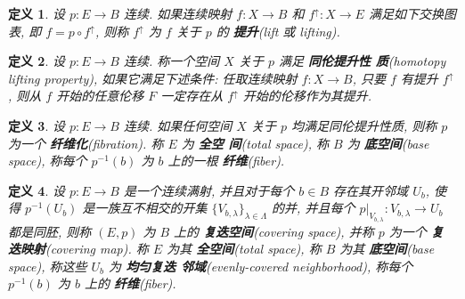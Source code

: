 \documentclass{ctexart}
\newtheorem*{defn}{定义}
\begin{document}
\begin{defn}
设 $p : E \to B$ 连续. 如果连续映射 $f : X \to B$ 和 $f^\uparrow : X
\to E$ 满足如下交换图表, 即 $f = p \circ f^\uparrow$, 则称
$f^\uparrow$ 为 $f$ 关于 $p$ 的 \textbf{提升}(lift 或 lifting).
\begin{center}
\end{center}
\end{defn}

\begin{defn}
设 $p : E \to B$ 连续. 称一个空间 $X$ 关于 $p$ 满足 \textbf{同伦提升性
  质}(homotopy lifting property), 如果它满足下述条件: 任取连续映射 $f
: X \to B$, 只要 $f$ 有提升 $f^\uparrow$, 则从 $f$ 开始的任意伦移 $F$
一定存在从 $f^\uparrow$ 开始的伦移作为其提升.
\end{defn}
\begin{center}
\end{center}

\begin{defn}
设 $p : E \to B$ 连续. 如果任何空间 $X$ 关于 $p$ 均满足同伦提升性质,
则称 $p$ 为一个 \textbf{纤维化}(fibration). 称 $E$ 为 \textbf{全空
  间}(total space), 称 $B$ 为 \textbf{底空间}(base space), 称每个
$p^{-1}(b)$ 为 $b$ 上的一根 \textbf{纤维}(fiber).
\end{defn}

\begin{defn}
设 $p : E \to B$ 是一个连续满射, 并且对于每个 $b \in B$ 存在其开邻域
$U_b$, 使得 $p^{-1}(U_b)$ 是一族互不相交的开集
$\{V_{b,\lambda}\}_{\lambda \in \Lambda}$ 的并, 并且每个
$p|_{V_{b,\lambda}} : V_{b,\lambda} \to U_b$ 都是同胚, 则称 $(E,p)$ 为
$B$ 上的 \textbf{复迭空间}(covering space), 并称 $p$ 为一个 \textbf{复
  迭映射}(covering map). 称 $E$ 为其 \textbf{全空间}(total space), 称
$B$ 为其 \textbf{底空间}(base space), 称这些 $U_b$ 为 \textbf{均匀复迭
  邻域}(evenly-covered neighborhood), 称每个 $p^{-1}(b)$ 为 $b$ 上的
\textbf{纤维}(fiber).
\end{defn}

\end{document}
